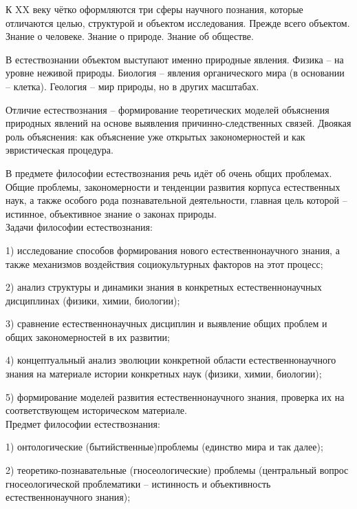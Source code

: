 \documentclass[exam_answers.tex]{subfiles}
\begin{document}
\renewcommand{\baselinestretch}{\blch}

 К XX веку чётко оформляются три сферы научного познания, которые отличаются целью, структурой и объектом исследования.
 Прежде всего объектом.
 Знание о человеке.
 Знание о природе.
 Знание об обществе.
 
 В естествознании объектом выступают именно природные явления.
 Физика -- на уровне неживой природы.
 Биология -- явления органического мира (в основании -- клетка).
 Геология -- мир природы, но в других масштабах.

Отличие естествознания -- формирование теоретических моделей объяснения природных явлений на основе выявления причинно-следственных связей.
Двоякая роль объяснения: как объяснение уже открытых закономерностей и как эвристическая процедура.

В предмете философии естествознания речь идёт об очень общих проблемах.
Общие проблемы, закономерности и тенденции развития корпуса естественных наук,
а также особого рода познавательной деятельности, главная цель которой -- истинное, объективное знание о законах природы.
\\

Задачи философии естествознания:

1) исследование способов формирования нового естественнонаучного знания, а также механизмов воздействия социокультурных факторов на этот процесс;

2) анализ структуры и динамики знания в конкретных естественнонаучных дисциплинах (физики, химии, биологии);

3) сравнение естественнонаучных дисциплин и выявление общих проблем и общих закономерностей в их развитии;

4) концептуальный анализ эволюции конкретной области естественнонаучного знания на материале истории конкретных наук (физики, химии, биологии);

5) формирование моделей развития естественнонаучного знания, проверка их на соответствующем историческом материале.
\\

Предмет философии естествознания:

1) онтологические (бытийственные)проблемы (единство мира и так далее);

2) теоретико-познавательные (гносеологические) проблемы (центральный вопрос гносеологической проблематики -- истинность и объективность естественнонаучного знания);
\end{document}
